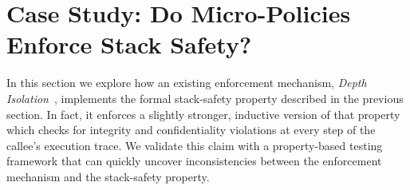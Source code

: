 \documentclass[acmsmall,review,anonymous]{acmart}\settopmatter{printfolios=true,printccs=false,printacmref=false}
\begin{document}
{%




\section{Case Study: Do Micro-Policies Enforce Stack Safety?}
\label{sec:enforcement}



In this section we explore how an existing enforcement mechanism, {\em
  Depth Isolation}~\citep{DBLP:conf/sp/RoesslerD18}, implements
the formal stack-safety property described in the previous
section. In fact, it enforces a slightly stronger, inductive version
of that property which checks for integrity and confidentiality violations at
every step of the callee's execution trace. We validate this claim
with a property-based testing framework that can quickly uncover
inconsistencies between the enforcement mechanism and the stack-safety
property.

}
\end{document}
